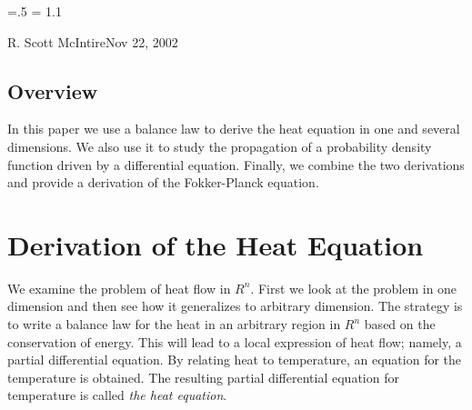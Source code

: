 

\parindent=0pt
\parskip=.5\baselineskip
\baselineskip = 1.1\baselineskip

\footline{\hss\tenrm\folio\hss}

{R. Scott McIntire}{Nov 22, 2002}

\subsection{Overview}

In this paper we use a balance law to derive the heat equation in one and 
several dimensions. We also use it to study the propagation of a probability
density function driven by a differential equation. Finally, we combine the 
two derivations and provide a derivation of the Fokker-Planck equation.


\section{Derivation of the Heat Equation}

We examine the problem of heat flow in $R^n$. First we look at the 
problem in one dimension and then see how it generalizes to arbitrary
dimension. The strategy is to write a balance law for the heat in 
an arbitrary region in $R^n$ based on the conservation of energy. 
This will lead to a local expression of heat flow;
namely, a partial differential equation. By relating heat to temperature, 
an equation for the temperature is obtained. 
The resulting partial differential equation for temperature is called 
{\it the heat equation\/}.


